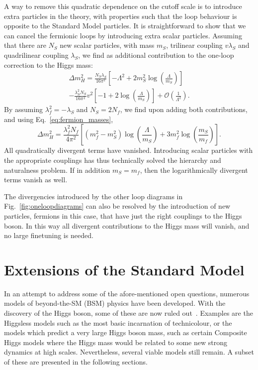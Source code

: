 A way to remove this quadratic dependence on the cutoff scale is to introduce extra particles in
the theory, with properties such that the loop behaviour is opposite to the Standard Model
particles. It is straightforward to show that we can cancel the fermionic loops by introducing
extra scalar particles. 
Assuming that there are $N_S$ new scalar particles, with mass $m_S$, trilinear coupling $v\lambda_S$
and quadrilinear coupling $\lambda_S$, we find as additional contribution to the
one-loop correction to the Higgs mass:
\begin{multline}
  \Delta m_H^2 =  \frac{N_S\lambda_S}{16\pi^2} \left[ - \Lambda^2 + 2 m_S^2 \log
\left(\frac{\Lambda}{m_S}\right)\right] \\ - \frac{\lambda_S^2 N_S}{16 \pi^2} v^2 \left[ -1 + 2
\log\left(\frac{\Lambda}{m_S}\right) \right] + \mathcal{O}\left(\frac{1}{\Lambda^2}\right) .
\end{multline}
By assuming $\lambda_f^2 = - \lambda_S$ and $N_S = 2 N_f$, we find upon adding both
contributions, and using Eq.~\ref{eq:fermion_masses},
\begin{equation}
  \Delta m_H^2 = \frac{\lambda_f^2 N_f}{4\pi^2} \left[ \left(m_f^2-m_S^2\right)
\log\left(\frac{\Lambda}{m_S}\right) + 3 m_f^2 \log\left(\frac{m_S}{m_f}\right) \right] .
\end{equation}
All quadratically divergent terms have vanished. Introducing scalar particles with the
appropriate couplings has thus technically solved the hierarchy and naturalness problem. 
If in addition $m_S = m_f$, then the logarithmically divergent terms vanish as well. 

The divergencies introduced by the other loop diagrams in Fig.~\ref{fig:oneloopdiagrams} can also be
resolved by the introduction of new particles, fermions in this case, that have just the right
couplings to the Higgs boson. In this way all divergent contributions to the Higgs mass will
vanish, and no large finetuning is needed. 


\section{Extensions of the Standard Model \label{sec:extensions_standard_model}}


In an attempt to address some of the afore-mentioned open questions, numerous models of
beyond-the-SM (BSM) physics have been developed. With the discovery of the Higgs boson, some of
these are now ruled out~\cite{Cheng:2007bu}. Examples are the Higgsless models such as the most
basic incarnation of technicolour, or the models which predict a very large Higgs boson mass, such
as certain Composite Higgs models where the Higgs mass would be related to some new strong dynamics
at high scales. 
Nevertheless, several viable models still remain. A subset of these are presented in the following
sections.

